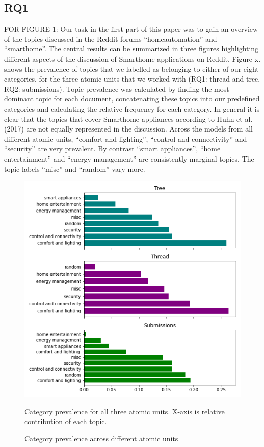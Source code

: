\documentclass{article}
\begin{document}
    \subsection{RQ1}
    FOR FIGURE 1: Our task in the first part of this paper was to gain an overview of the topics discussed in the Reddit forums “homeautomation” and “smarthome”. The central results can be summarized in three figures highlighting different aspects of the discussion of Smarthome applications on Reddit. Figure x. shows the prevalence of topics that we labelled as belonging to either of our eight categories, for the three atomic units that we worked with (RQ1: thread and tree, RQ2: submissions). Topic prevalence was calculated by finding the most dominant topic for each document, concatenating these topics into our predefined categories and calculating the relative frequency for each category. In general it is clear that the topics that cover Smarthome appliances according to Huhn et al. (2017) are not equally represented in the discussion. Across the models from all different atomic units, “comfort and lighting”, “control and connectivity” and “security” are very prevalent. By contrast “smart appliances”, “home entertainment” and “energy management” are consistently marginal topics. The topic labels “misc” and “random” vary more. 
    
    \begin{figure}[H]
        \begin{centering}
        \includegraphics[scale=0.5]{../Figure/Topic_Prevalence.png}
        \caption{Category prevalence across different atomic units}
        \end{centering}
        \begin{footnotesize} 
            Category prevalence for all three atomic units. X-axis is relative contribution of each topic. 
        \end{footnotesize}
    \end{figure}
    
\end{document}
